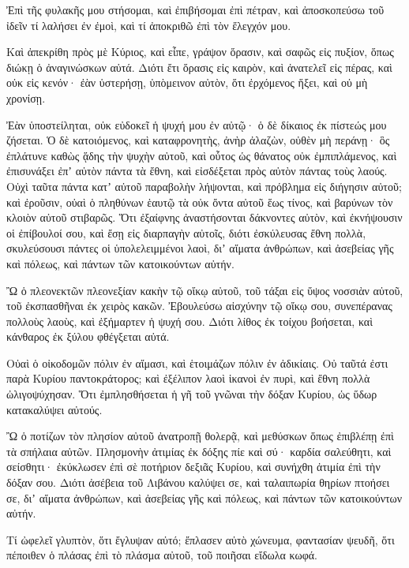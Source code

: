 \begin{spacing}{1.1}
\begin{multicols}{2}
Ἐπὶ τῆς φυλακῆς μου στήσομαι, καὶ ἐπιβήσομαι ἐπὶ πέτραν, καὶ ἀποσκοπεύσω τοῦ ἰδεῖν τί λαλήσει ἐν ἐμοὶ, καὶ τί ἀποκριθῶ ἐπὶ τὸν ἔλεγχόν μου.

Καὶ ἀπεκρίθη πρὸς μὲ Κύριος, καὶ εἶπε, γράψον ὅρασιν, καὶ σαφῶς εἰς πυξίον, ὅπως διώκῃ ὁ ἀναγινώσκων αὐτά.
Διότι ἔτι ὅρασις εἰς καιρὸν, καὶ ἀνατελεῖ εἰς πέρας, καὶ οὐκ εἰς κενόν· ἐὰν ὑστερήσῃ, ὑπὸμεινον αὐτὸν, ὅτι ἐρχόμενος ἥξει, καὶ οὐ μὴ χρονίσῃ.

Ἐὰν ὑποστείληται, οὐκ εὐδοκεῖ ἡ ψυχή μου ἐν αὐτῷ· ὁ δὲ δίκαιος ἐκ πίστεώς μου ζήσεται.
Ὁ δὲ κατοιόμενος, καὶ καταφρονητὴς, ἀνὴρ ἀλαζὼν, οὐθὲν μὴ περάνῃ· ὃς ἐπλάτυνε καθὼς ᾅδης τὴν ψυχὴν αὐτοῦ, καὶ οὗτος ὡς θάνατος οὐκ ἐμπιπλάμενος, καὶ ἐπισυνάξει ἐπʼ αὐτὸν πάντα τὰ ἔθνη, καὶ εἰσδέξεται πρὸς αὐτὸν πάντας τοὺς λαούς.
Οὐχὶ ταῦτα πάντα κατʼ αὐτοῦ παραβολὴν λήψονται, καὶ πρόβλημα εἰς διήγησιν αὐτοῦ; καὶ ἐροῦσιν, οὐαὶ ὁ πληθύνων ἑαυτῷ τὰ οὐκ ὄντα αὐτοῦ ἕως τίνος, καὶ βαρύνων τὸν κλοιὸν αὐτοῦ στιβαρῶς.
Ὅτι ἐξαίφνης ἀναστήσονται δάκνοντες αὐτὸν, καὶ ἐκνήψουσιν οἱ ἐπίβουλοί σου, καὶ ἔσῃ εἰς διαρπαγὴν αὐτοῖς,
διότι ἐσκύλευσας ἔθνη πολλὰ, σκυλεύσουσι πάντες οἱ ὑπολελειμμένοι λαοὶ, διʼ αἵματα ἀνθρώπων, καὶ ἀσεβείας γῆς καὶ πόλεως, καὶ πάντων τῶν κατοικούντων αὐτήν.

Ὢ ὁ πλεονεκτῶν πλεονεξίαν κακὴν τῷ οἴκῳ αὐτοῦ, τοῦ τάξαι εἰς ὕψος νοσσιὰν αὐτοῦ, τοῦ ἐκσπασθῆναι ἐκ χειρὸς κακῶν.
Ἐβουλεύσω αἰσχύνην τῷ οἴκῳ σου, συνεπέρανας πολλοὺς λαοὺς, καὶ ἐξήμαρτεν ἡ ψυχή σου.
Διότι λίθος ἐκ τοίχου βοήσεται, καὶ κάνθαρος ἐκ ξύλου φθέγξεται αὐτά.

Οὐαὶ ὁ οἰκοδομῶν πόλιν ἐν αἵμασι, καὶ ἑτοιμάζων πόλιν ἐν ἀδικίαις.
Οὐ ταῦτά ἐστι παρὰ Κυρίου παντοκράτορος; καὶ ἐξέλιπον λαοὶ ἱκανοὶ ἐν πυρὶ, καὶ ἔθνη πολλὰ ὠλιγοψύχησαν.
Ὅτι ἐμπλησθήσεται ἡ γῆ τοῦ γνῶναι τὴν δόξαν Κυρίου, ὡς ὕδωρ κατακαλύψει αὐτούς.

Ὢ ὁ ποτίζων τὸν πλησίον αὐτοῦ ἀνατροπῇ θολερᾷ, καὶ μεθύσκων ὅπως ἐπιβλέπῃ ἐπὶ τὰ σπήλαια αὐτῶν.
Πλησμονὴν ἀτιμίας ἐκ δόξης πίε καὶ σύ· καρδία σαλεύθητι, καὶ σείσθητι· ἐκύκλωσεν ἐπὶ σὲ ποτήριον δεξιᾶς Κυρίου, καὶ συνήχθη ἀτιμία ἐπὶ τὴν δόξαν σου.
Διότι ἀσέβεια τοῦ Λιβάνου καλύψει σε, καὶ ταλαιπωρία θηρίων πτοήσει σε, διʼ αἵματα ἀνθρώπων, καὶ ἀσεβείας γῆς καὶ πόλεως, καὶ πάντων τῶν κατοικούντων αὐτήν.

Τί ὠφελεῖ γλυπτὸν, ὅτι ἔγλυψαν αὐτό; ἔπλασεν αὐτὸ χώνευμα, φαντασίαν ψευδῆ, ὅτι πέποιθεν ὁ πλάσας ἐπὶ τὸ πλάσμα αὐτοῦ, τοῦ ποιῆσαι εἴδωλα κωφά.


\end{multicols}
\end{spacing}
